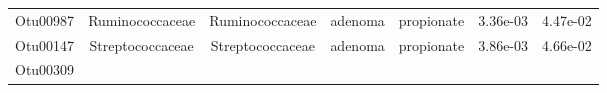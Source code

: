 \documentclass[11pt,]{article}
\begin{document}
\begin{longtable}[]{@{}ccccccc@{}}
\begin{minipage}[t]{0.09\columnwidth}\centering\strut
Otu00987\strut
\end{minipage} & \begin{minipage}[t]{0.17\columnwidth}\centering\strut
Ruminococcaceae\strut
\end{minipage} & \begin{minipage}[t]{0.17\columnwidth}\centering\strut
Ruminococcaceae\strut
\end{minipage} & \begin{minipage}[t]{0.09\columnwidth}\centering\strut
adenoma\strut
\end{minipage} & \begin{minipage}[t]{0.11\columnwidth}\centering\strut
propionate\strut
\end{minipage} & \begin{minipage}[t]{0.09\columnwidth}\centering\strut
3.36e-03\strut
\end{minipage} & \begin{minipage}[t]{0.09\columnwidth}\centering\strut
4.47e-02\strut
\end{minipage}\tabularnewline
\begin{minipage}[t]{0.09\columnwidth}\centering\strut
Otu00147\strut
\end{minipage} & \begin{minipage}[t]{0.17\columnwidth}\centering\strut
Streptococcaceae\strut
\end{minipage} & \begin{minipage}[t]{0.17\columnwidth}\centering\strut
Streptococcaceae\strut
\end{minipage} & \begin{minipage}[t]{0.09\columnwidth}\centering\strut
adenoma\strut
\end{minipage} & \begin{minipage}[t]{0.11\columnwidth}\centering\strut
propionate\strut
\end{minipage} & \begin{minipage}[t]{0.09\columnwidth}\centering\strut
3.86e-03\strut
\end{minipage} & \begin{minipage}[t]{0.09\columnwidth}\centering\strut
4.66e-02\strut
\end{minipage}\tabularnewline
\begin{minipage}[t]{0.09\columnwidth}\centering\strut
Otu00309\strut
\end{minipage} & \begin{minipage}[t]{0.17\columnwidth}\centering\strut

\end{minipage}
\end{longtable}
\end{document}
